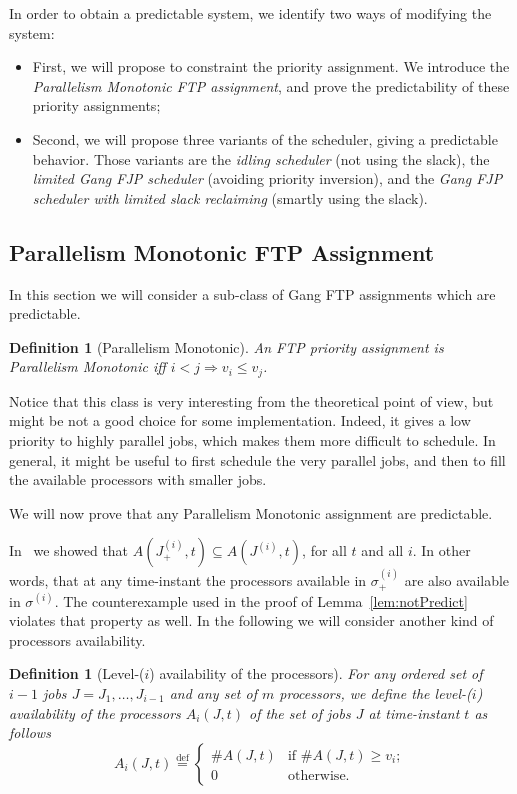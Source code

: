 \documentclass[a4paper]{article}
\newtheorem{definition}[theorem]{Definition}
\newcommand{\equals}{\stackrel{\mathrm{def}}{=}}
\begin{document}
In order to obtain a predictable system, we identify two ways of modifying the system:
\begin{itemize}
\item First, we will propose to constraint the priority assignment. We introduce the \emph{Parallelism Monotonic FTP assignment}, and prove the predictability of these priority assignments;
\item Second, we will propose three variants of the scheduler, giving a predictable behavior. Those variants are the \emph{idling scheduler} (not using the slack), the \emph{limited Gang FJP scheduler} (avoiding priority inversion), and the \emph{Gang FJP scheduler with limited slack reclaiming} (smartly using the slack).
\end{itemize}


\subsection{Parallelism Monotonic FTP Assignment}
In this section we will consider a sub-class of Gang FTP assignments which are predictable.
\begin{definition}[Parallelism Monotonic]
An FTP priority assignment is \emph{Parallelism Monotonic} iff $i<j \Rightarrow v_{i} \leq v_{j}$. 
\end{definition}

Notice that this class is very interesting from the theoretical point of view, but might be not a good choice for some implementation. Indeed, it gives a low priority to highly parallel jobs, which makes them more difficult to schedule. In general, it might be useful to first schedule the very parallel jobs, and then to fill the available processors with smaller jobs.

We will now prove that any Parallelism Monotonic assignment are predictable.

In~\cite{Cucu-Grosjean2009Predictability-} we showed that $A(J^{(i)}_{+},t) \subseteq A(J^{(i)},t)$, for all $t$ and all $i$. In other words, that at any time-instant the processors available in ${\sigma^{(i)}_{+}}$ are also available in ${\sigma^{(i)}}$. The counterexample used in the proof of Lemma~\ref{lem:notPredict} violates that property as well. In the following we will consider another kind of processors availability.

\begin{definition}[Level-($i$) availability of the processors]
For any ordered set of $i-1$ jobs $J=J_{1}, \ldots,J_{i-1}$ and any set of $m$ processors, we define the \emph{level-($i$) availability of the processors} $A_{i}(J,t)$ of the set of jobs $J$ at time-instant $t$ as follows 
\[ A_{i}(J,t) \equals \begin{cases} 
	\#A(J,t) & \text{if $\#A(J,t)\geq v_{i}$};\\
 	0 & \text{otherwise}.
\end{cases}
\]
\end{definition}
\end{document}
